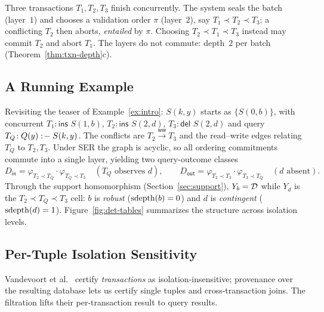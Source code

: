 \begin{example}
  \label{ex:txn-batch}
  Three transactions $T_1,T_2,T_3$ finish concurrently. The system seals the
  batch (layer~$1$) and chooses a validation order $\pi$ (layer~$2$), say
  $T_1 \prec T_2 \prec T_3$; a conflicting $T_2$ then aborts, \emph{entailed} by
  $\pi$. Choosing $T_2 \prec T_1 \prec T_3$ instead may commit $T_2$ and abort
  $T_1$. The layers do not commute: depth~$2$ per batch
  (Theorem~\ref{thm:txn-depth}c).
\end{example}

\subsection{A Running Example}
\label{ex:txn-running}

Revisiting the teaser of Example~\ref{ex:intro}: $S(k,y)$ starts as
$\{S(0,b)\}$, with concurrent
$T_1\!:\textsf{ins } S(1,b)$, $T_2\!:\textsf{ins } S(2,d)$,
$T_3\!:\textsf{del } S(2,d)$ and query $T_Q\!: Q(y) \mathrel{:\!-} S(k,y)$. The
conflicts are $T_2 \xrightarrow{\mathsf{ww}} T_3$ and the read--write edges
relating $T_Q$ to $T_2,T_3$. Under SER the graph is acyclic, so all ordering
commitments commute into a single layer, yielding two query-outcome classes
\[
  D_{\mathsf{in}} = \varphi_{T_2 \prec T_Q} \cdot \varphi_{T_Q \prec T_3}
  \quad(\text{$T_Q$ observes $d$}),
  \qquad
  D_{\mathsf{out}} = \varphi_{T_2 \prec T_3} \cdot \varphi_{T_3 \prec T_Q}
  \quad(\text{$d$ absent}).
\]
Through the support homomorphism (Section~\ref{sec:support}),
$Y_b = \mathcal{D}$ while $Y_d$ is the $T_2 \prec T_Q \prec T_3$ cell: $b$ is
\emph{robust} ($\operatorname{sdepth}(b)=0$) and $d$ is \emph{contingent}
($\operatorname{sdepth}(d)=1$). Figure~\ref{fig:det-tables} summarizes the structure across
isolation levels.

\subsection{Per-Tuple Isolation Sensitivity}
\label{sec:txn-sensitivity}

Vandevoort et al.~\cite{vandevoort2025mixed} certify \emph{transactions} as
isolation-insensitive; provenance over the resulting database lets us certify
single tuples and cross-transaction joins. The filtration lifts their
per-transaction result to query results.

